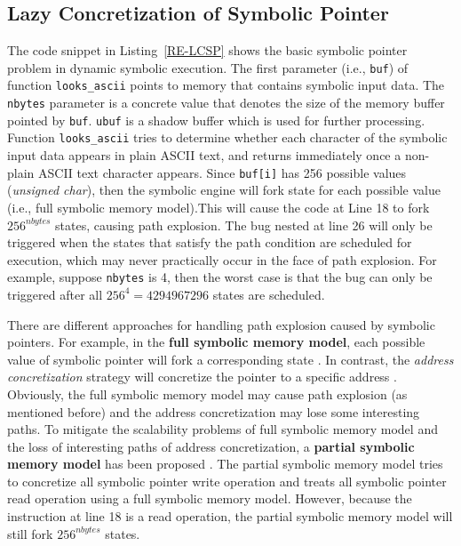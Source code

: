 \subsection{Lazy Concretization of Symbolic Pointer}
The code snippet in Listing~\ref{RE-LCSP} shows the basic symbolic pointer 
problem in dynamic symbolic execution. The first parameter 
(i.e., \texttt{buf}) of function \texttt{looks\_ascii} points to memory 
that contains symbolic input data. The \texttt{nbytes} parameter is a 
concrete value that denotes the size of the memory buffer pointed by 
\texttt{buf}. \texttt{ubuf} is a shadow buffer which is used for further 
processing. 
Function \texttt{looks\_ascii} tries to determine whether each character 
of the symbolic input data appears in plain ASCII text, and returns 
immediately once a non-plain ASCII text character appears. 
Since \texttt{buf[i]} has 256 possible values (\textit{unsigned char}), 
then the symbolic engine will fork state for each possible value (i.e., 
full symbolic memory model).This will cause the code at Line 18 to fork 
$256^{nbytes}$ states, causing path explosion. The bug nested at line 26 
will only be triggered when the states that satisfy the path condition 
are scheduled for execution, which may never practically occur in the 
face of path explosion. For example, suppose \texttt{nbytes} is 4, then 
the worst case is that the bug can only be triggered after all 
$256^4=4294967296$ states are scheduled.

There are different approaches for handling path explosion caused by 
symbolic pointers. For example, in the \textbf{full symbolic memory model}, 
each possible value of symbolic pointer will fork a corresponding state 
\cite{song2008bitblaze, thakur2010directed, brumley2011bap, trtik2014symbolic}.
In contrast, the \textit{address concretization} strategy will concretize 
the pointer to a specific address \cite{godefroid2005dart, burnim2008heuristics}. 
Obviously, the full symbolic memory model may cause path explosion 
(as mentioned before) and the address concretization may lose some 
interesting paths. To mitigate the scalability problems of full symbolic 
memory model and the loss of interesting paths of address concretization, 
a \textbf{partial symbolic memory model} has been proposed \cite{cha2012unleashing, avgerinos2014exploiting, Shoshitaishvili_firmalice-automatic}. The partial 
symbolic memory model tries to concretize all symbolic pointer write 
operation and treats all symbolic pointer read operation using a full 
symbolic memory model. However, because the instruction at line 18 is a 
read operation, the partial symbolic memory model will still fork $256^{nbytes}$ states.

